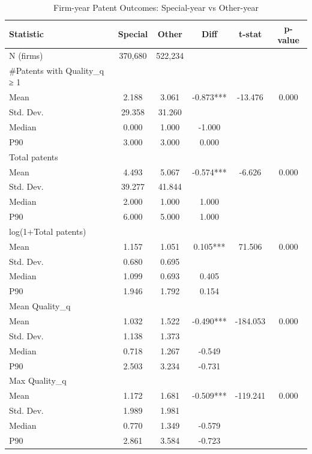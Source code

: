 \begin{table}
\caption{Firm-year Patent Outcomes: Special-year vs Other-year}
\label{tab:firmyear_compare}
\begin{tabular}{lccccc}
\toprule
Statistic & Special & Other & Diff & t-stat & p-value \\
\midrule
N (firms) & 370,680 & 522,234 &  &  &  \\
#Patents with Quality_q ≥ 1 &  &  &  &  &  \\
  Mean & 2.188 & 3.061 & -0.873*** & -13.476 & 0.000 \\
  Std. Dev. & 29.358 & 31.260 &  &  &  \\
  Median & 0.000 & 1.000 & -1.000 &  &  \\
  P90 & 3.000 & 3.000 & 0.000 &  &  \\
Total patents &  &  &  &  &  \\
  Mean & 4.493 & 5.067 & -0.574*** & -6.626 & 0.000 \\
  Std. Dev. & 39.277 & 41.844 &  &  &  \\
  Median & 2.000 & 1.000 & 1.000 &  &  \\
  P90 & 6.000 & 5.000 & 1.000 &  &  \\
log(1+Total patents) &  &  &  &  &  \\
  Mean & 1.157 & 1.051 & 0.105*** & 71.506 & 0.000 \\
  Std. Dev. & 0.680 & 0.695 &  &  &  \\
  Median & 1.099 & 0.693 & 0.405 &  &  \\
  P90 & 1.946 & 1.792 & 0.154 &  &  \\
Mean Quality_q &  &  &  &  &  \\
  Mean & 1.032 & 1.522 & -0.490*** & -184.053 & 0.000 \\
  Std. Dev. & 1.138 & 1.373 &  &  &  \\
  Median & 0.718 & 1.267 & -0.549 &  &  \\
  P90 & 2.503 & 3.234 & -0.731 &  &  \\
Max Quality_q &  &  &  &  &  \\
  Mean & 1.172 & 1.681 & -0.509*** & -119.241 & 0.000 \\
  Std. Dev. & 1.989 & 1.981 &  &  &  \\
  Median & 0.770 & 1.349 & -0.579 &  &  \\
  P90 & 2.861 & 3.584 & -0.723 &  &  \\
\bottomrule
\end{tabular}
\end{table}
